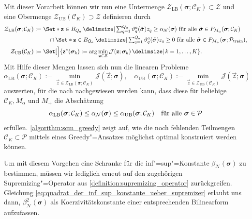 \documentclass[../main.tex]{subfiles}
\begin{document}
Mit dieser Vorarbeit können wir nun eine Untermenge $\mathcal Z_{\mathrm{LB}}(\bm \sigma; \mathcal C_{K}) \subset \mathcal Z$ und eine Obermenge $\mathcal Z_{\mathrm{UB}}(\mathcal C_{K}) \supset \mathcal Z$ definieren durch
\begin{equation}
    \begin{aligned}
        \mathcal Z_{\mathrm{LB}}(\bm \sigma; \mathcal C_{K}) &:=
        \begin{multlined}[t]
        \Set*{\vec{z} \in B_{Q_a} \given
        \textstyle\sum_{q = 1}^{Q_a} \theta_{q}^{a}(\tilde{\bm \sigma})z_{q} \geq \alpha_{\mathcal N}(\bm \sigma)~\fa \tilde{\bm \sigma} \in P_{M_{\alpha}}(\bm \sigma; \mathcal C_{K})
        }
        \\ \cap
        \Set*{\vec{z} \in B_{Q_a} \given
        \textstyle\sum_{q = 1}^{Q_a} \theta_{q}^{a}(\tilde{\bm \sigma}) z_{q} \geq 0~\fa \tilde{\bm \sigma} \in P_{M_{+}}(\bm \sigma; \mathcal P_{\mathrm{train}})
        },
        \end{multlined}\\
        \mathcal Z_{\mathrm{UB}}(\mathcal C_{K}) &:= \Set[\Big]{ \vec{z}^{*}(\bm \sigma_{k}) := \arg \min_{\vec z \in \mathcal Z} \mathcal J(\vec{z}; \bm \sigma_{k}) \given k = 1, \dots, K}.
    \end{aligned}
\end{equation}
Mit Hilfe dieser Mengen lassen sich nun die linearen Probleme
\begin{equation}
    \alpha_{\mathrm{LB}}(\bm \sigma; \mathcal C_{K}) := \min_{\vec{z} \in \mathcal Z_{\mathrm{LB}}(\bm \sigma; \mathcal C_{K})} \mathcal J(\vec{z}; \bm \sigma),
    \quad
    \alpha_{\mathrm{UB}}(\bm \sigma; \mathcal C_{K}) := \min_{\vec{z} \in \mathcal Z_{\mathrm{UB}}(\mathcal C_{K})} \mathcal J(\vec{z}; \bm \sigma)
\end{equation}
auswerten, für die nach \cite[Proposition 1]{Huynh2007} nachgewiesen werden kann, dass diese für beliebige $\mathcal C_{K}, M_{\alpha}$ und $M_{+}$ die Abschätzung
\begin{equation}
    \alpha_{\mathrm{LB}}(\bm \sigma; \mathcal C_{K}) \leq \alpha_{\mathcal N}(\bm \sigma) \leq \alpha_{\mathrm{UB}}(\bm \sigma; \mathcal C_{K}) \quad \fa \bm \sigma \in \mathcal P
\end{equation}
erfüllen.
\cref{algorithm:scm_greedy} zeigt auf, wie die noch fehlenden Teilmengen $\mathcal C_{K} \subset \mathcal P$ mittels eines Greedy"=Ansatzes möglichst optimal konstruiert werden können.

Um mit diesem Vorgehen eine Schranke für die inf"=sup"=Konstante $\beta_{\mathcal N}(\bm \sigma)$ zu bestimmen, müssen wir lediglich erneut auf den zugehörigen Supremizing"=Operator aus \cref{definition:supremizing_operator} zurückgreifen.
Gleichung \cref{eq:quadrat_der_inf_sup_konstante_ueber_supremizer} erlaubt uns dann, $\beta_{\mathcal N}^{2}(\bm \sigma)$ als Koerzivitätskonstante einer entsprechenden Bilinearform aufzufassen.
\end{document}
